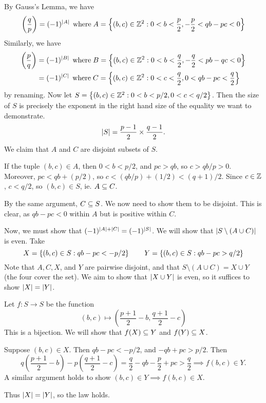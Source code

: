 \documentclass{article}
\begin{document}
\begin{prf}
    By Gauss's Lemma, we have
    \[
	\left( \frac{q}{p} \right) = (-1)^{\left\lvert A \right\rvert} \mathrel{\, \text{where}} A = \left\lbrace (b, c) \in \mathbb{Z}^2 : 0 < b < \frac{p}{2}, -\frac{p}{2} < qb - pc < 0 \right\rbrace
	\]
	Similarly, we have
    \begin{align*}
	\left( \frac{p}{q} \right) &= (-1)^{\left\lvert B \right\rvert} \mathrel{\, \text{where}} B = \left\lbrace (b, c) \in \mathbb{Z}^2 : 0 < b < \frac{q}{2}, -\frac{q}{2} < pb - qc < 0 \right\rbrace \\
	 &= (-1)^{\left\lvert C \right\rvert} \mathrel{\, \text{where}} C = \left\lbrace (b, c) \in \mathbb{Z}^2 : 0 < c < \frac{q}{2}, 0 < qb - pc < \frac{q}{2} \right\rbrace
	\end{align*}
	by renaming. Now let $S = \left\lbrace (b, c) \in \mathbb{Z}^2 : 0 < b < p/2, 0 < c < q/2 \right\rbrace$. Then the size of $S$ is precisely the exponent in the right hand size of the equality we want to demonstrate.
	\[
	\left\lvert S \right\rvert = \frac{p-1}{2} \times \frac{q-1}{2}.
	\]
	We claim that $A$ and $C$ are disjoint subsets of $S$.
	
	If the tuple $(b, c) \in A$, then $0 < b < p/2$, and $pc > qb$, so $c > qb/p > 0$. Moreover, $pc < qb + (p/2)$, so $c < (qb/p) + (1/2) < (q+1)/2$. Since $c \in \mathbb{Z}$, $c < q/2$, so $(b, c) \in S$, ie. $A \subseteq C$.
	
	By the same argument, $C \subseteq S$. We now need to show them to be disjoint. This is clear, as $qb-pc < 0$ within $A$ but is positive within $C$.
	
	Now, we must show that $(-1)^{\left\lvert A \right\rvert + \left\lvert C \right\rvert} = (-1)^{\left\lvert S \right\rvert}$. We will show that $\left\lvert S \setminus (A \cup C) \right\rvert$ is even. Take
	\[
	X = \left\lbrace (b, c) \in S: qb - pc < -p/2 \right\rbrace \qquad Y = \left\lbrace (b, c) \in S: qb - pc > q/2 \right\rbrace
	\]
	Note that $A, C, X$, and $Y$ are pairwise disjoint, and that $S \setminus (A \cup C) = X \cup Y$ (the four cover the set). We aim to show that $\left\lvert X \cup Y \right\rvert$ is even, so it suffices to show $\left\lvert X \right\rvert = \left\lvert Y \right\rvert$.
	
	Let $f: S \to S$ be the function
	\[
	(b, c) \mapsto \left( \frac{p+1}{2} - b, \frac{q+1}{2} - c \right)
	\]
	This is a bijection. We will show that $f(X) \subseteq Y$ and  $f(Y) \subseteq X$.
	
	Suppose $(b, c) \in X$. Then $qb - pc < -p/2$, and $-qb + pc > p/2$. Then
	\[
	q \left( \frac{p+1}{2} - b \right) - p \left( \frac{q+1}{2} - c \right) = \frac{q}{2} - qb - \frac{p}{2} + pc > \frac{q}{2} \implies f(b, c) \in Y.
	\]
	A similar argument holds to show $(b, c) \in Y \implies f(b, c) \in X$.
	
	Thus $\left\lvert X \right\rvert = \left\lvert Y \right\rvert$, so the law holds.
\end{prf}
\end{document}
